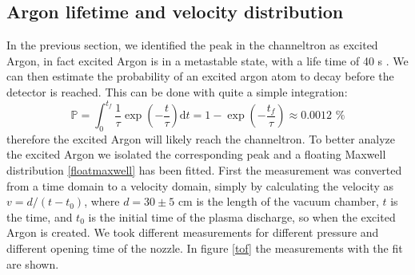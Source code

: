 \documentclass[a4paper,10pt]{article}
\begin{document}
\subsection{Argon lifetime and velocity distribution}
In the previous section, we identified the peak in the channeltron as excited Argon, in fact excited Argon is in a metastable state, with a life time of 40 s \cite{lifetime}.
We can then estimate the probability of an excited argon atom to decay before the detector is reached. This can be done with quite a simple integration:
\begin{equation}
	\mathbb{P} = \int_0^{t_f} \frac{1}{\tau} \exp(-\frac{t}{\tau}) \mathrm{d}t = 1 - \exp(-\frac{t_f}{\tau}) \approx 0.0012 \,\,\%
\end{equation}
therefore the excited Argon will likely reach the channeltron. To better analyze the excited Argon we isolated the corresponding peak and a floating Maxwell distribution \eqref{floatmaxwell} has been fitted. First the measurement was converted from a time domain to a velocity domain, simply by calculating the velocity as $v = d/(t-t_0)$, where $d = 30\pm 5$ cm is the length of the vacuum chamber, $t$ is the time, and $t_0$ is the initial time of the plasma discharge, so when the excited Argon is created. We took different measurements for different pressure and different opening time of the nozzle. In figure \ref{tof} the measurements with the fit are shown.
\end{document}
